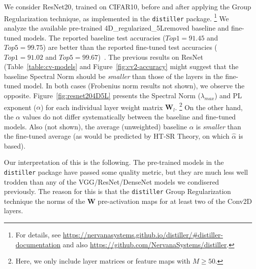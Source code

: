 We consider ResNet20, trained on CIFAR10, before and after applying the Group Regularization technique, as implemented in the \texttt{distiller} package.%
\footnote{For details, see \url{https://nervanasystems.github.io/distiller/\#distiller-documentation} and also \url{https://github.com/NervanaSystems/distiller}.}
We analyze the available pre-trained 4D\_regularized\_5Lremoved baseline and fine-tuned models.  %
The reported baseline test accuracies ($Top1=91.45$ and $Top5=99.75$) are better than the reported fine-tuned test accuracies ($Top1=91.02$ and $Top5=99.67$)~\cite{XXX-XXX}.
The previous results on ResNet (Table~\ref{table:cv-models} and Figure~\ref{fig:cv2-accuracy} might suggest that the baseline Spectral Norm should be \emph{smaller} than those of the layers in the fine-tuned model.
In both cases (Frobenius norm results not shown), we observe the opposite.
Figure~\ref{fig:resnet204D5L} presents the Spectral Norm ($\lambda_{max}$) and PL exponent ($\alpha$) for each individual layer weight matrix $\mathbf{W}_{l}$.%
\footnote{Here, we only include layer matrices or feature maps with $M\ge50$.}
On the other hand, the $\alpha$ values do not differ systematically between the baseline and fine-tuned models.
Also (not shown), the average (unweighted) baseline $\alpha$ is \emph{smaller} than the fine-tuned average (as would be predicted by HT-SR Theory, on which $\hat{\alpha}$ is based).


Our interpretation of this is the following.
The pre-trained models in the \texttt{distiller} package have passed some quality metric, but they are much less well trodden than any of the VGG/ResNet/DenseNet models we condisered previously.
%
The reason for this is that the \texttt{distiller} Group Regularization technique 
 the norms of the $\mathbf{W}$ pre-activation maps for at least two of the Conv2D layers.


